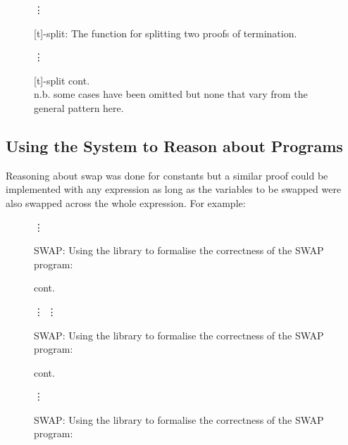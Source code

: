 \documentclass[oneside,12pt]{article}
\begin{document}
\begin{figure}
  \caption{[t]-split: The function for splitting two proofs of termination. }
  \footnotesize
  {\centering }
  {\centering \hfill \Huge{\vdots} \hfill }
\end{figure}

\begin{figure}\ContinuedFloat
  \caption{[t]-split cont. \\
   n.b. some cases have been omitted but none that vary from the general pattern here. }
  \footnotesize
  {\centering \hfill \Huge{\vdots} \hfill }
  {\centering }
\end{figure}



\subsection{Using the System to Reason about Programs}

Reasoning about swap was done for constants but a similar proof could be implemented with any expression as long as the variables to be swapped were also swapped across the whole expression. For example:


\begin{figure}
  \caption{SWAP: Using the library to formalise the correctness of the SWAP program:}
  \small
  {\centering }
  {\centering \hfill \Huge{\vdots} \hfill }
\end{figure}

\begin{figure}\ContinuedFloat
  \caption{SWAP: Using the library to formalise the correctness of the SWAP program:}
  \small
  \vspace{-0.5cm}
  \begin{center}\!\!\!\small{cont.}\end{center}
  {\centering \hfill \Huge{\vdots} \hfill }
  {\centering }
  {\centering \hfill \Huge{\vdots} \hfill }
\end{figure}

\begin{figure}\ContinuedFloat
  \caption{SWAP: Using the library to formalise the correctness of the SWAP program:}
  \small
  \vspace{-0.5cm}
  \begin{center}\!\!\!\small{cont.}\end{center}
  {\centering \hfill \Huge{\vdots} \hfill }
  {\centering }
\end{figure}
\end{document}
